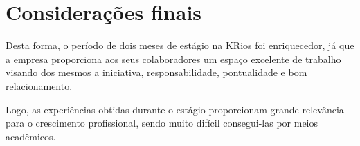 \chapter{Considerações finais}\label{chap:conclusao}

Desta forma, o período de dois meses de estágio na KRios foi enriquecedor, já que a empresa proporciona aos 
seus colaboradores um espaço excelente de trabalho visando dos mesmos a iniciativa, responsabilidade, 
pontualidade e bom relacionamento. 

Logo, as experiências obtidas durante o estágio proporcionam grande relevância para o crescimento profissional, 
sendo muito difícil consegui-las por meios acadêmicos.

